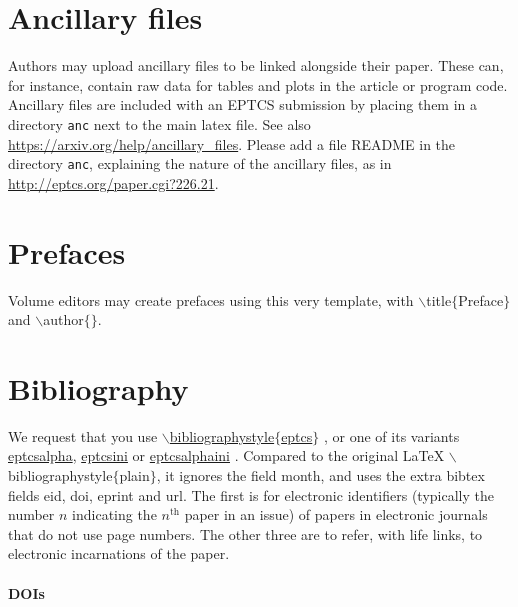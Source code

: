 \documentclass[submission,copyright,creativecommons]{eptcs}
\begin{document}
\section{Ancillary files}

Authors may upload ancillary files to be linked alongside their paper.
These can, for instance, contain raw data for tables and plots in the
article or program code.  Ancillary files are included with an EPTCS
submission by placing them in a directory \texttt{anc} next to the
main latex file. See also \url{https://arxiv.org/help/ancillary_files}.
Please add a file README in the directory \texttt{anc}, explaining the
nature of the ancillary files, as in
\url{http://eptcs.org/paper.cgi?226.21}.

\section{Prefaces}

Volume editors may create prefaces using this very template,
with {\ttfamily $\backslash$title$\{$Preface$\}$} and {\ttfamily $\backslash$author$\{\}$}.

\section{Bibliography}

We request that you use
\href{http://eptcs.web.cse.unsw.edu.au/eptcs.bst}
{\ttfamily $\backslash$bibliographystyle$\{$eptcs$\}$}
\cite{bibliographystylewebpage}, or one of its variants
\href{http://eptcs.web.cse.unsw.edu.au/eptcsalpha.bst}{eptcsalpha},
\href{http://eptcs.web.cse.unsw.edu.au/eptcsini.bst}{eptcsini} or
\href{http://eptcs.web.cse.unsw.edu.au/eptcsalphaini.bst}{eptcsalphaini}
\cite{bibliographystylewebpage}. Compared to the original {\LaTeX}
{\ttfamily $\backslash$biblio\-graphystyle$\{$plain$\}$},
it ignores the field {\ttfamily month}, and uses the extra
bibtex fields {\ttfamily eid}, {\ttfamily doi}, {\ttfamily eprint} and {\ttfamily url}.
The first is for electronic identifiers (typically the number $n$
indicating the $n^\mathrm{th}$ paper in an issue) of papers in electronic
journals that do not use page numbers. The other three are to refer,
with life links, to electronic incarnations of the paper.

\paragraph{DOIs}
\end{document}
